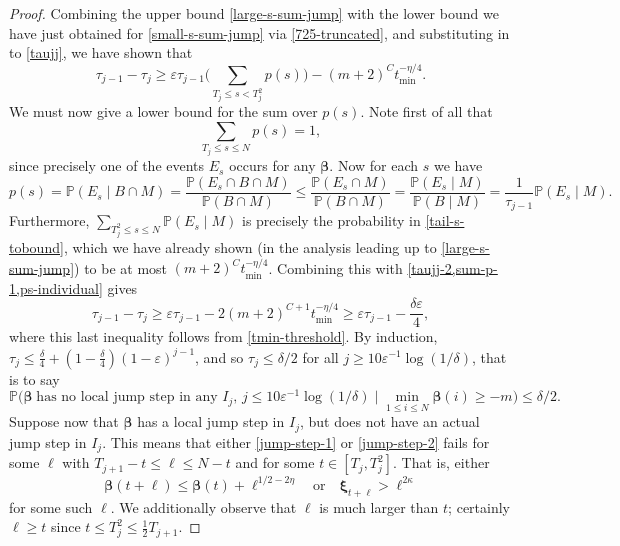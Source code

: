 \documentclass[11pt,reqno]{amsart}
\numberwithin{equation}{section}
\theoremstyle{definition}
\theoremstyle{remark}
\newcommand{\mb}{\mathbb}
\newcommand{\eps}{\varepsilon}
\def\boldbeta{\boldsymbol\beta}
\def\boldxi{\boldsymbol\xi}
\renewcommand{\le}{\leqslant}
\renewcommand{\ge}{\geqslant}
\begin{document}
\begin{proof}
Combining the upper bound \cref{large-s-sum-jump} with the lower bound we have just obtained for \cref{small-s-sum-jump} via \cref{725-truncated}, and substituting in to \cref{taujj}, we have shown that 
\begin{equation}\label{taujj-2} \tau_{j-1} - \tau_j  \ge \eps \tau_{j-1} \big( \sum_{T_j \le s < T_{j}^2} p(s)\big) - (m+2)^{C} t_{\min}^{-\eta/4}.\end{equation}
We must now give a lower bound for the sum over $p(s)$. Note first of all that 
\begin{equation}\label{sum-p-1} \sum_{T_j \le s \le N} p(s) = 1,\end{equation} since precisely one of the events $E_s$ occurs for any $\boldbeta$. Now for each $s$ we have
\begin{equation}\label{ps-individual} p(s) = \mb{P}(E_s \mid B \cap M) = \frac{\mb{P}(E_s \cap B \cap M)}{\mb{P}(B \cap M)} \le \frac{\mb{P}(E_s \cap M)}{\mb{P}(B \cap M)} = \frac{\mb{P}(E_s \mid M)}{\mb{P}(B \mid M)} = \frac{1}{\tau_{j-1}} \mb{P}(E_s \mid M).\end{equation} Furthermore, $\sum_{T_{j}^2 \le s \le N} \mb{P}(E_s \mid M)$ is precisely the probability in \cref{tail-s-tobound}, which we have already shown (in the analysis leading up to \cref{large-s-sum-jump}) to be at most $(m + 2)^{C} t_{\min}^{-\eta/4}$. Combining this with \cref{taujj-2,sum-p-1,ps-individual} gives 
\begin{equation*} \tau_{j-1} - \tau_j  \ge \eps\tau_{j-1}  -2(m+2)^{C+1} t_{\min}^{-\eta/4} \ge \eps\tau_{j-1} - \frac{\delta\eps}{4},\end{equation*} where this last inequality follows from \cref{tmin-threshold}. By induction, $\tau_j \le \frac{\delta}{4} + (1 - \frac{\delta}{4})(1 - \eps)^{j - 1}$, and so $\tau_j \le \delta/2$ for all $j \ge 10 \eps^{-1} \log(1/\delta)$, that is to say
\begin{equation}\label{loc-jump} \mb{P} \big(\boldbeta \; \mbox{has no local jump step in any $I_j$, $j \le 10 \eps^{-1} \log(1/\delta)$} \mid \min_{1 \le i \le N} \boldbeta(i) \ge -m\big) \le \delta/2.\end{equation}
Suppose now that $\boldbeta$ has a local jump step in $I_j$, but does not have an actual jump step in $I_j$. This means that either \cref{jump-step-1} or \cref{jump-step-2} fails for some $\ell$ with $T_{j+1} - t \le \ell \le N - t$ and for some $t \in [T_j, T_{j}^2]$. That is, either
\begin{equation}\label{failure-1} \boldbeta(t + \ell) \le \boldbeta(t) + \ell^{1/2 - 2\eta} \quad \mbox{or} \quad \boldxi_{t+\ell} > \ell^{2\kappa} \end{equation}
for some such $\ell$. We additionally observe that $\ell$ is much larger than $t$; certainly $\ell \ge t$ since $t \le T_j^2 \le \frac{1}{2} T_{j+1}$.


\end{proof}
\end{document}
